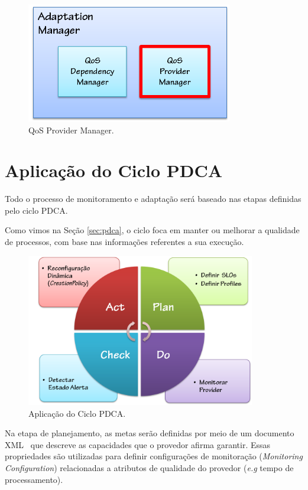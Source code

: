 \begin{figure}[htp]
\centering
\includegraphics[width=9cm]{chapters/chapter4/adaptation-manager.png}
\caption[QoS Provider Manager]{QoS Provider Manager.}
\label{fig:proposal}
\end{figure}



\section{Aplicação do Ciclo PDCA}
Todo o processo de monitoramento e adaptação será baseado nas etapas definidas pelo ciclo PDCA.

Como vimos na Seção \ref{sec:pdca}, o ciclo foca em manter ou melhorar a qualidade de processos, com base nas informações referentes a sua execução.

\begin{figure}[htp]
\centering
\includegraphics[width=10cm]{chapters/chapter4/pdca_actions.png}
\caption[Aplicação do Ciclo PDCA]{Aplicação do Ciclo PDCA.}
\label{fig:pdcamapping}
\end{figure}


Na etapa de planejamento, as metas serão definidas por meio de um documento XML~\cite{xml} que descreve as capacidades que o provedor afirma garantir. Essas propriedades são utilizadas para definir configurações de monitoração (\textit{Monitoring Configuration}) relacionadas a atributos de qualidade do provedor (\textit{e.g} tempo de processamento).

